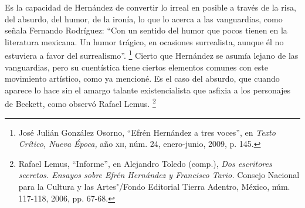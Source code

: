 \documentclass[14pt,twoside,final]{extbook} %
\let\oldfootnote\footnote
\renewcommand\footnote[1]{%
\oldfootnote{\hspace{1mm}#1}}
\begin{document}
Es la capacidad de Hernández de convertir lo irreal en posible a través de la risa, del absurdo, del humor, de la ironía, lo que lo acerca a las vanguardias, como señala Fernando Rodríguez: ``Con un sentido del humor que pocos tienen en la literatura mexicana. Un humor trágico, en ocasiones surrealista, aunque él no estuviera a favor del surrealismo''.\footnote{José Julián González Osorno, ``Efrén Hernández a tres voces'', en \emph{Texto Crítico, Nueva Época,} año \textsc{xii}, núm. 24, enero-junio, 2009, p. 145.} Cierto que Hernández se asumía lejano de las vanguardias, pero su cuentística tiene ciertos elementos comunes con este movimiento artístico, como ya mencioné. Es el caso del absurdo, que cuando aparece lo hace sin el amargo talante existencialista que asfixia a los personajes de Beckett, como observó Rafael Lemus.\footnote{Rafael Lemus, ``Informe'', en Alejandro Toledo (comp.), \emph{Dos escritores secretos. Ensayos sobre Efrén Hernández y Francisco Tario.} Consejo Nacional para la Cultura y las Artes"/Fondo Editorial Tierra Adentro, México, núm. 117-118, 2006, pp. 67-68.}
\end{document}
